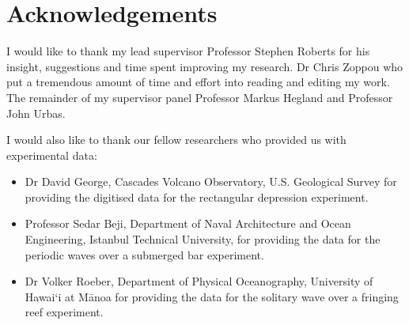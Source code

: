 
\chapter*{Acknowledgements}\label{acknowledgements}




I would like to thank my lead supervisor Professor Stephen Roberts for his insight, suggestions and time spent improving my research. Dr Chris Zoppou who put a tremendous amount of time and effort into reading and editing my work. The remainder of my supervisor panel Professor Markus Hegland and Professor John Urbas.


I would also like to thank our fellow researchers who provided us with experimental data:
\begin{itemize}
	\item Dr David George, Cascades Volcano Observatory, U.S. Geological Survey for providing the digitised data for the rectangular depression experiment.
	\item Professor Sedar Beji, Department of Naval Architecture and Ocean Engineering, Istanbul Technical University, for providing the data for the periodic waves over a submerged bar experiment.
	\item Dr Volker Roeber, Department of Physical Oceanography, University of Hawai`i at M\={a}noa for providing the data for the solitary wave over a fringing reef experiment.  
\end{itemize}
